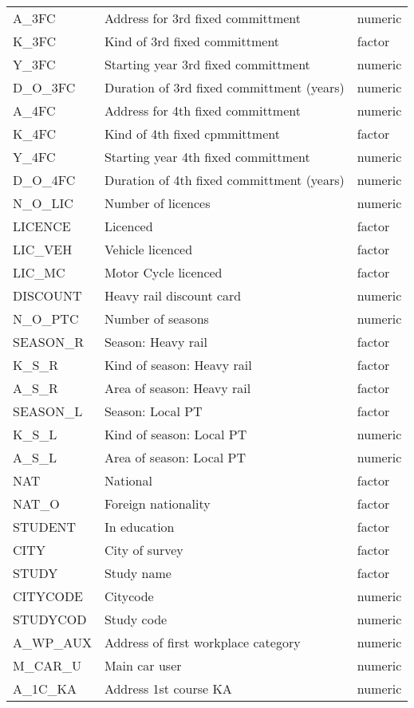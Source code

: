 \begin{longtable}{lll}
  A\_3FC & Address for 3rd fixed committment & numeric \\ 
  K\_3FC & Kind of 3rd fixed committment & factor \\ 
  Y\_3FC & Starting year 3rd fixed committment & numeric \\ 
  D\_O\_3FC & Duration of 3rd fixed committment (years) & numeric \\ 
  A\_4FC & Address for 4th fixed committment & numeric \\ 
  K\_4FC & Kind of 4th fixed cpmmittment & factor \\ 
  Y\_4FC & Starting year 4th fixed committment & numeric \\ 
  D\_O\_4FC & Duration of 4th fixed committment  (years) & numeric \\ 
  N\_O\_LIC & Number of licences & numeric \\ 
  LICENCE & Licenced & factor \\ 
  LIC\_VEH & Vehicle licenced & factor \\ 
  LIC\_MC & Motor Cycle licenced & factor \\ 
  DISCOUNT & Heavy rail discount card & numeric \\ 
  N\_O\_PTC & Number of seasons & numeric \\ 
  SEASON\_R & Season: Heavy rail & factor \\ 
  K\_S\_R & Kind of season: Heavy rail & factor \\ 
  A\_S\_R & Area of season: Heavy rail & factor \\ 
  SEASON\_L & Season: Local PT & factor \\ 
  K\_S\_L & Kind of season: Local PT & numeric \\ 
  A\_S\_L & Area of season: Local PT & numeric \\ 
  NAT & National & factor \\ 
  NAT\_O & Foreign nationality & factor \\ 
  STUDENT & In education & factor \\ 
  CITY & City of survey & factor \\ 
  STUDY & Study name & factor \\ 
  CITYCODE & Citycode & numeric \\ 
  STUDYCOD & Study code & numeric \\ 
  A\_WP\_AUX & Address of first workplace category & numeric \\ 
  M\_CAR\_U & Main car user & numeric \\ 
  A\_1C\_KA & Address 1st course KA & numeric \\ 

\end{longtable}
